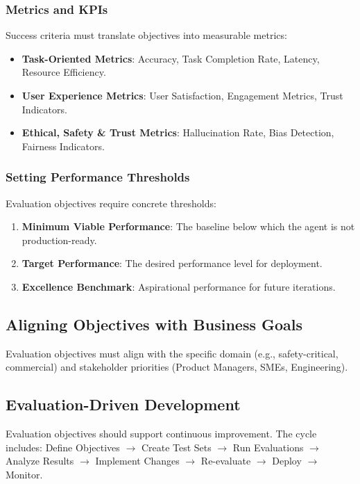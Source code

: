 \begin{TNtwocol}
\subsubsection{Metrics and KPIs}
Success criteria must translate objectives into measurable metrics:
\begin{itemize}
    \item \textbf{Task-Oriented Metrics}: Accuracy, Task Completion Rate, Latency, Resource Efficiency.
    \item \textbf{User Experience Metrics}: User Satisfaction, Engagement Metrics, Trust Indicators.
    \item \textbf{Ethical, Safety \& Trust Metrics}: Hallucination Rate, Bias Detection, Fairness Indicators.
\end{itemize}

\subsubsection{Setting Performance Thresholds}
Evaluation objectives require concrete thresholds:
\begin{enumerate}
    \item \textbf{Minimum Viable Performance}: The baseline below which the agent is not production-ready.
    \item \textbf{Target Performance}: The desired performance level for deployment.
    \item \textbf{Excellence Benchmark}: Aspirational performance for future iterations.
\end{enumerate}

\subsection{Aligning Objectives with Business Goals}
Evaluation objectives must align with the specific domain (e.g., safety-critical, commercial) and stakeholder priorities (Product Managers, SMEs, Engineering).

\subsection{Evaluation-Driven Development}
Evaluation objectives should support continuous improvement. The cycle includes: Define Objectives $\rightarrow$ Create Test Sets $\rightarrow$ Run Evaluations $\rightarrow$ Analyze Results $\rightarrow$ Implement Changes $\rightarrow$ Re-evaluate $\rightarrow$ Deploy $\rightarrow$ Monitor.
\end{TNtwocol}
